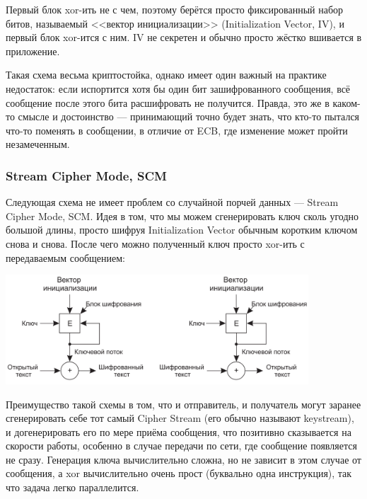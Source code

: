 \documentclass{../mcstext}
\begin{document}
Первый блок xor-ить не с чем, поэтому берётся просто фиксированный набор битов, называемый <<вектор инициализации>> (Initialization Vector, IV), и первый блок xor-ится с ним. IV не секретен и обычно просто жёстко вшивается в приложение.

Такая схема весьма криптостойка, однако имеет один важный на практике недостаток: если испортится хотя бы один бит зашифрованного сообщения, всё сообщение после этого бита расшифровать не получится. Правда, это же в каком-то смысле и достоинство --- принимающий точно будет знать, что кто-то пытался что-то поменять в сообщении, в отличие от ECB, где изменение может пройти незамеченным.

\subsubsection{Stream Cipher Mode, SCM}

Следующая схема не имеет проблем со случайной порчей данных --- Stream Cipher Mode, SCM. Идея в том, что мы можем сгенерировать ключ сколь угодно большой длины, просто шифруя Initialization Vector обычным коротким ключом снова и снова. После чего можно полученный ключ просто xor-ить с передаваемым сообщением: 

\begin{center}
    \includegraphics[width=0.85\textwidth]{scm.png}
\end{center}

Преимущество такой схемы в том, что и отправитель, и получатель могут заранее сгенерировать себе тот самый Cipher Stream (его обычно называют keystream), и догенерировать его по мере приёма сообщения, что позитивно сказывается на скорости работы, особенно в случае передачи по сети, где сообщение появляется не сразу. Генерация ключа вычислительно сложна, но не зависит в этом случае от сообщения, а xor вычислительно очень прост (буквально одна инструкция), так что задача легко параллелится.
\end{document}

